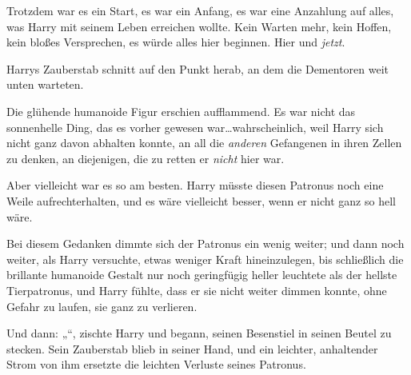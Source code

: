 Trotzdem war es ein Start, es war ein Anfang, es war eine Anzahlung auf alles, was Harry mit seinem Leben erreichen wollte. Kein Warten mehr, kein Hoffen, kein bloßes Versprechen, es würde alles hier beginnen. Hier und \emph{jetzt}.

Harrys Zauberstab schnitt auf den Punkt herab, an dem die Dementoren weit unten warteten.


Die glühende humanoide Figur erschien aufflammend. Es war nicht das sonnenhelle Ding, das es vorher gewesen war…wahrscheinlich, weil Harry sich nicht ganz davon abhalten konnte, an all die \emph{anderen} Gefangenen in ihren Zellen zu denken, an diejenigen, die zu retten er \emph{nicht} hier war.

Aber vielleicht war es so am besten. Harry müsste diesen Patronus noch eine Weile aufrechterhalten, und es wäre vielleicht besser, wenn er nicht ganz so hell wäre.

Bei diesem Gedanken dimmte sich der Patronus ein wenig weiter; und dann noch weiter, als Harry versuchte, etwas weniger Kraft hineinzulegen, bis schließlich die brillante humanoide Gestalt nur noch geringfügig heller leuchtete als der hellste Tierpatronus, und Harry fühlte, dass er sie nicht weiter dimmen konnte, ohne Gefahr zu laufen, sie ganz zu verlieren.

Und dann: „“, zischte Harry und begann, seinen Besenstiel in seinen Beutel zu stecken. Sein Zauberstab blieb in seiner Hand, und ein leichter, anhaltender Strom von ihm ersetzte die leichten Verluste seines Patronus.


